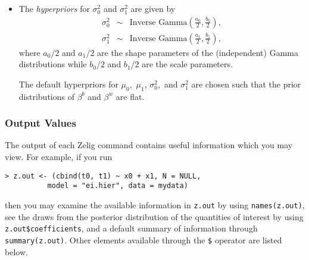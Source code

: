\begin{itemize}
\item The \emph{hyperpriors} for $\sigma_{0}^{2}$ and $\sigma_{1}^{2}$ are
given by
\begin{eqnarray*}
\sigma_{0}^{2}& \sim& \textrm{Inverse Gamma}\left(\frac{a_{0}}{2},\frac{b_{0}}{2}\right),\\
\sigma_{1}^{2}& \sim& \textrm{Inverse Gamma}\left(\frac{a_{1}}{2},\frac{b_{1}}{2}\right),
\end{eqnarray*}
where $a_{0}/2$ and $a_{1}/2$ are the shape parameters of the
(independent) Gamma distributions while $b_{0}/2$ and $b_{1}/2$ are
the scale parameters. 

The default hyperpriors for $\mu_{0},$ $\mu_{1}$, $\sigma_{0}^{2},$
and $\sigma_{1}^{2}$ are chosen such that the prior distributions of
$\beta^b$ and $\beta^w$ are flat.

\end{itemize}

\subsubsection{Output Values}

The output of each Zelig command contains useful information which you may
view. For example, if you run
\begin{verbatim}
> z.out <- (cbind(t0, t1) ~ x0 + x1, N = NULL, 
          model = "ei.hier", data = mydata)
\end{verbatim}

\noindent then you may examine the available information in 
\texttt{z.out} by using \texttt{names(z.out)}, 
see the draws from the posterior distribution of
the quantities of interest by using \texttt{z.out\$coefficients}, 
and a default summary of information through \texttt{summary(z.out)}. 
Other elements available through the \texttt{\$} operator are listed below.

